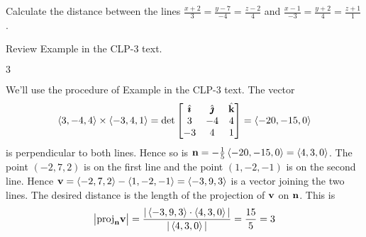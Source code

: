 \begin{question}
Calculate the distance between the lines 
$\frac{x+2}{3}=\frac{y-7}{-4}=\frac{z-2}{4}$ and $\frac{x-1}{-3}=\frac{y+2}{4}=\frac{z+1}{1}$.
\end{question}

\begin{hint}
Review Example 
in the CLP-3 text.
\end{hint}

\begin{answer}
$3$
\end{answer}

\begin{solution}
We'll use the procedure of Example 
in the CLP-3 text. 
The vector 
\begin{equation*}
\left< 3,-4,4\right> \times\left< -3,4,1\right> 
=\det\left[\begin{matrix}
           \hat{\pmb{\imath}} & \hat{\pmb{\jmath}} & \hat{\mathbf{k}} \\
           3  &  -4  &  4 \\
          -3  &   4  & 1
  \end{matrix}\right]
=\left< -20,-15,0\right> 
\end{equation*}
is perpendicular to both lines. Hence so is 
$\mathbf{n}=-\frac{1}{5}\left< -20,-15,0\right> =\left< 4,3,0\right> $. The point
$(-2,7,2)$ is on the first line and the point $(1,-2,-1)$ is on the second
line. Hence 
$\mathbf{v}=\left< -2,7,2 \right>-\left<1,-2,-1 \right>=\left< -3,9,3\right> $ is a vector 
joining the two lines. 
The desired distance is the length of the projection of $\mathbf{v}$ on $\mathbf{n}$. 
This is 
\begin{equation*}
\big|{\rm proj}_{\mathbf{n}}\mathbf{v}\big|
=\frac{|\left< -3,9,3\right> \cdot\left< 4,3,0\right>|}{|\left< 4,3,0\right>|} 
=\frac{15}{5}=3
\end{equation*}
\end{solution}


